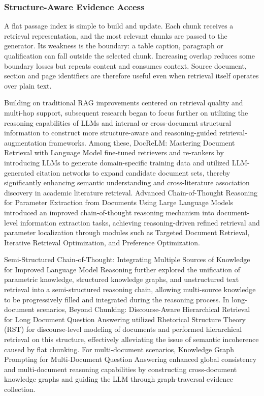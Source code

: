 \subsubsection{Structure-Aware Evidence Access}

A flat passage index is simple to build and update. Each chunk receives a retrieval representation, and the most relevant chunks are passed to the generator. Its weakness is the boundary: a table caption, paragraph or qualification can fall outside the selected chunk. Increasing overlap reduces some boundary losses but repeats content and consumes context. Source document, section and page identifiers are therefore useful even when retrieval itself operates over plain text.

Building on traditional RAG improvements centered on retrieval quality and multi-hop support, subsequent research began to focus further on utilizing the reasoning capabilities of LLMs and internal or cross-document structural information to construct more structure-aware and reasoning-guided retrieval-augmentation frameworks. Among these, DocReLM: Mastering Document Retrieval with Language Model \cite{wei2024docrelm} fine-tuned retrievers and re-rankers by introducing LLMs to generate domain-specific training data and utilized LLM-generated citation networks to expand candidate document sets, thereby significantly enhancing semantic understanding and cross-literature association discovery in academic literature retrieval. Advanced Chain-of-Thought Reasoning for Parameter Extraction from Documents Using Large Language Models \cite{chen2025advanced} introduced an improved chain-of-thought reasoning mechanism into document-level information extraction tasks, achieving reasoning-driven refined retrieval and parameter localization through modules such as Targeted Document Retrieval, Iterative Retrieval Optimization, and Preference Optimization.

Semi-Structured Chain-of-Thought: Integrating Multiple Sources of Knowledge for Improved Language Model Reasoning \cite{su2024semi} further explored the unification of parametric knowledge, structured knowledge graphs, and unstructured text retrieval into a semi-structured reasoning chain, allowing multi-source knowledge to be progressively filled and integrated during the reasoning process. In long-document scenarios, Beyond Chunking: Discourse-Aware Hierarchical Retrieval for Long Document Question Answering \cite{chen2025chunkingdiscourseawarehierarchicalretrieval} utilized Rhetorical Structure Theory (RST) for discourse-level modeling of documents and performed hierarchical retrieval on this structure, effectively alleviating the issue of semantic incoherence caused by flat chunking. For multi-document scenarios, Knowledge Graph Prompting for Multi-Document Question Answering \cite{wang2024knowledge} enhanced global consistency and multi-document reasoning capabilities by constructing cross-document knowledge graphs and guiding the LLM through graph-traversal evidence collection.

